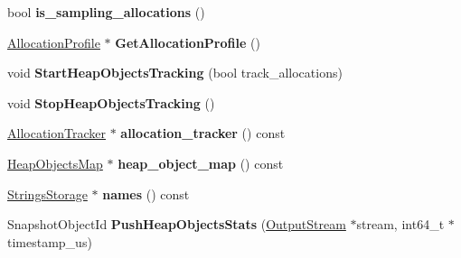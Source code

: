 \begin{DoxyCompactItemize}
\item 
bool {\bfseries is\+\_\+sampling\+\_\+allocations} ()\hypertarget{classv8_1_1internal_1_1_heap_profiler_a86086b88dc16e57899c00bf16d963e54}{}\label{classv8_1_1internal_1_1_heap_profiler_a86086b88dc16e57899c00bf16d963e54}

\item 
\hyperlink{classv8_1_1internal_1_1_allocation_profile}{Allocation\+Profile} $\ast$ {\bfseries Get\+Allocation\+Profile} ()\hypertarget{classv8_1_1internal_1_1_heap_profiler_a99eb6162d9266d584c75119074cddde6}{}\label{classv8_1_1internal_1_1_heap_profiler_a99eb6162d9266d584c75119074cddde6}

\item 
void {\bfseries Start\+Heap\+Objects\+Tracking} (bool track\+\_\+allocations)\hypertarget{classv8_1_1internal_1_1_heap_profiler_a7efaf5b020faba52d5006f6122977fb2}{}\label{classv8_1_1internal_1_1_heap_profiler_a7efaf5b020faba52d5006f6122977fb2}

\item 
void {\bfseries Stop\+Heap\+Objects\+Tracking} ()\hypertarget{classv8_1_1internal_1_1_heap_profiler_a4ee8e40dc2d3ef72428da51cb7eafdee}{}\label{classv8_1_1internal_1_1_heap_profiler_a4ee8e40dc2d3ef72428da51cb7eafdee}

\item 
\hyperlink{classv8_1_1internal_1_1_allocation_tracker}{Allocation\+Tracker} $\ast$ {\bfseries allocation\+\_\+tracker} () const \hypertarget{classv8_1_1internal_1_1_heap_profiler_a394aa6391103de6cb286676afab8382b}{}\label{classv8_1_1internal_1_1_heap_profiler_a394aa6391103de6cb286676afab8382b}

\item 
\hyperlink{classv8_1_1internal_1_1_heap_objects_map}{Heap\+Objects\+Map} $\ast$ {\bfseries heap\+\_\+object\+\_\+map} () const \hypertarget{classv8_1_1internal_1_1_heap_profiler_aa171a49c462515a4a41252f41d7533d5}{}\label{classv8_1_1internal_1_1_heap_profiler_aa171a49c462515a4a41252f41d7533d5}

\item 
\hyperlink{classv8_1_1internal_1_1_strings_storage}{Strings\+Storage} $\ast$ {\bfseries names} () const \hypertarget{classv8_1_1internal_1_1_heap_profiler_ae02c1a69bde63936715ab463f1e4962c}{}\label{classv8_1_1internal_1_1_heap_profiler_ae02c1a69bde63936715ab463f1e4962c}

\item 
Snapshot\+Object\+Id {\bfseries Push\+Heap\+Objects\+Stats} (\hyperlink{classv8_1_1_output_stream}{Output\+Stream} $\ast$stream, int64\+\_\+t $\ast$timestamp\+\_\+us)\hypertarget{classv8_1_1internal_1_1_heap_profiler_a3e8339bfde2671aacc0f9ffb6869d1f6}{}\label{classv8_1_1internal_1_1_heap_profiler_a3e8339bfde2671aacc0f9ffb6869d1f6}


\end{DoxyCompactItemize}
